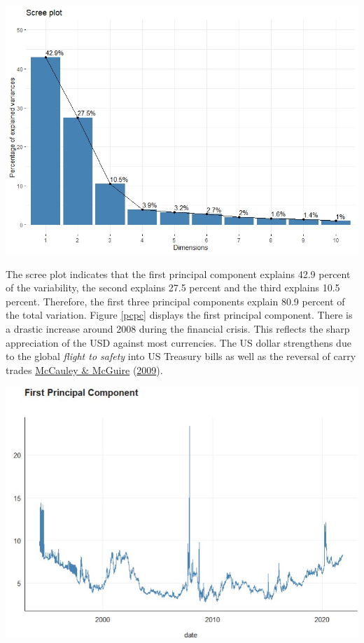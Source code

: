\documentclass[11pt,preprint, authoryear]{elsarticle}
\let\origfigure\figure
\let\endorigfigure\endfigure
\renewenvironment{figure}[1][2] {
    \expandafter\origfigure\expandafter[H]
} {
    \endorigfigure
}
\numberwithin{equation}{section}
\numberwithin{figure}{section}
\numberwithin{table}{section}
\begin{document}
\begin{figure}[h]
\centering
\includegraphics[scale=0.7]{scree.jpg}
\caption{Scree plot}
\label{scree}
\end{figure}

The scree plot indicates that the first principal component explains
42.9 percent of the variability, the second explains 27.5 percent and
the third explains 10.5 percent. Therefore, the first three principal
components explain 80.9 percent of the total variation. Figure
\ref{pcpc} displays the first principal component. There is a drastic
increase around 2008 during the financial crisis. This reflects the
sharp appreciation of the USD against most currencies. The US dollar
strengthens due to the global \emph{flight to safety} into US Treasury
bills as well as the reversal of carry trades
\protect\hyperlink{ref-mcc2009}{McCauley \& McGuire}
(\protect\hyperlink{ref-mcc2009}{2009}).

\begin{figure}
\centering
\includegraphics[scale=0.9]{pc1.jpg}
\caption{First Principal Component }
\label{pcpc}
\end{figure}
\end{document}

